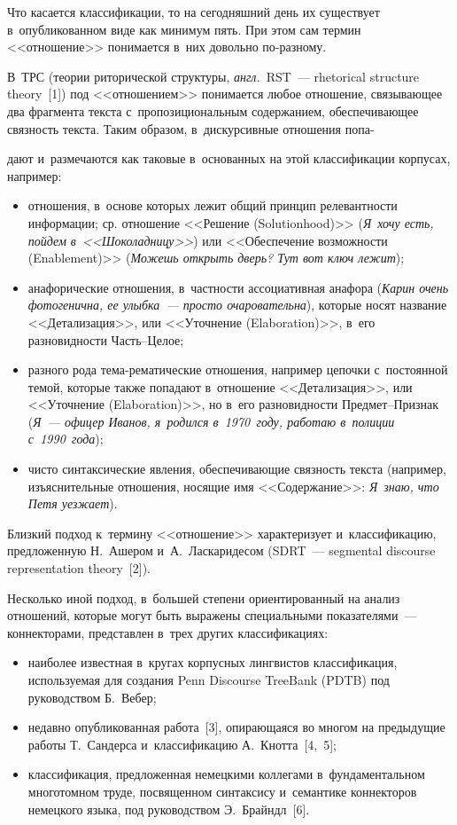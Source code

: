 \begin{multicols}{2}
  Что касается классификации, то на сегодняшний день их существует 
в~опубликованном виде как минимум пять. При этом сам термин 
<<отношение>> понимается в~них довольно по-раз\-но\-му. 

В~ТРС (теории риторической структуры, \textit{англ.}\ RST~--- rhetorical structure
theory~[1]) 
под <<отношением>> понимается любое отношение, свя\-зы\-ва\-ющее два 
фрагмента текста с~пропозициональным содержанием, обеспечивающее 
связность текста. Таким образом, в~дискурсивные отношения попа-\linebreak\vspace*{-12pt}

\pagebreak

\noindent
дают 
и~размечаются как таковые в~основанных на этой классификации корпусах, 
например: 
  \begin{itemize}
\item отношения, в~основе которых лежит общий принцип релевантности 
информации; ср. отношение <<Решение (Solutionhood)>> (\textit{Я~хочу 
есть, пойдем в~<<Шоколадницу>>}) или <<Обеспечение возможности 
(Enablement)>> (\textit{Можешь открыть дверь? Тут вот ключ лежит});
\item анафорические отношения, в~частности ассоциативная анафора 
(\textit{Карин очень фотогенична, ее улыбка~--- просто очаровательна}), 
которые носят название <<Детализация>>, или <<Уточнение 
(Elaboration)>>, в~его разновидности Часть--Це\-лое;
\item разного рода те\-ма-ре\-ма\-ти\-че\-ские отношения, например цепочки 
с~постоянной темой, которые также попадают в~отношение 
<<Детализация>>, или <<Уточнение (Elaboration)>>, но в~его разновидности 
Пред\-мет--Приз\-нак (\textit{Я~--- офицер Иванов, я~родился в~1970~году, 
работаю в~полиции с~1990~года});
\item чисто синтаксические явления, обес\-пе\-чи\-ва\-ющие связность текста 
(например, изъяснительные отношения, носящие имя <<Содержание>>: 
\textit{Я~знаю, что Петя уезжает}).
\end{itemize}

  Близкий подход к~термину <<отношение>> характеризует и~классификацию, 
предложенную Н.~Аше\-ром и~А.~Ласкаридесом (SDRT~--- segmental discourse
representation theory~[2]).
  
  Несколько иной подход, в~большей степени ориенти\-рованный на анализ 
отношений, которые могут быть выражены специальными показателями~--- 
коннекторами, представлен в~трех других классификациях: 
  \begin{itemize}
\item наиболее известная в~кругах корпусных лингвистов классификация, 
используемая для создания Penn Discourse TreeBank (PDTB) под руководством 
Б.~Вебер;
\item недавно опубликованная работа~[3], опи\-ра\-юща\-яся во многом на 
предыдущие работы Т.~Сан\-дер\-са и~классификацию А.~Кнот\-та~[4,~5];
\item классификация, предложенная немецкими коллегами 
в~фундаментальном многотомном труде, посвященном синтаксису 
и~семантике коннекторов немецкого языка, под руководством 
Э.~Брайндл~[6].
\end{itemize}


\end{multicols}
